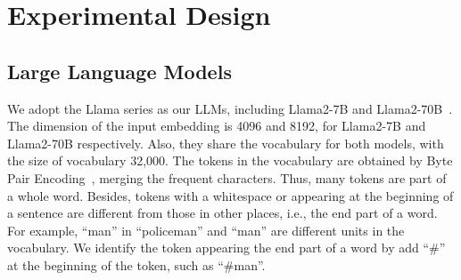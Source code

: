 

\section{Experimental Design}
\label{sec:experiment}

\subsection{Large Language Models}
We adopt the Llama series as our LLMs, including Llama2-7B and Llama2-70B~\cite{touvron2023llama}. The dimension of the input embedding is 4096 and 8192, for Llama2-7B and Llama2-70B respectively. 
Also, they share the vocabulary for both models, with the size of vocabulary 32,000. The tokens in the vocabulary are obtained by Byte Pair Encoding~\cite{sennrich2016neural}, merging the frequent characters. Thus, many tokens are part of a whole word. Besides, tokens with a whitespace or appearing at the beginning of a sentence are different from those in other places, i.e., the end part of a word. For example, 
``man'' in ``policeman'' and ``man''
are different units in the vocabulary. We identify the token appearing the end part of a word by add ``\#'' at the beginning of the token, such as ``\#man''.


